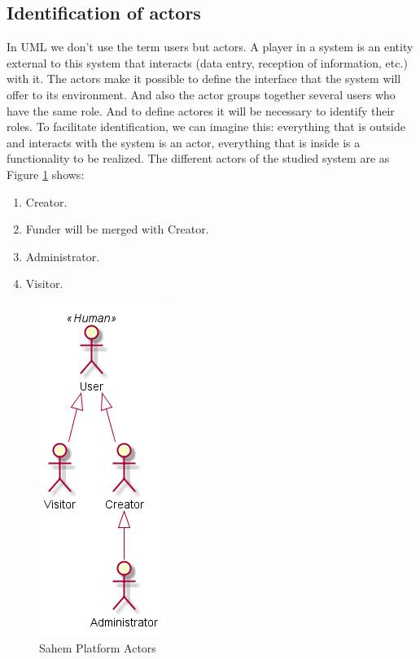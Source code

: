 \subsection{Identification of actors}
In UML we don't use the term users but actors. A player in a system is an entity external to this system that interacts (data entry, reception of information, etc.) with it. The actors make it possible to define the interface that the system will offer to its environment. And also the actor groups together several users who have the same role. And to define actores it will be necessary to identify their roles.
To facilitate identification, we can imagine this: everything that is outside and interacts with the system is an actor, everything that is inside is a functionality to be realized.
The different actors of the studied system are as Figure \ref{fig:sahemactors} shows:

\begin{enumerate}
    \item  Creator.
    \item  Funder will be merged with Creator.
    \item  Administrator.
    \item  Visitor.
\end{enumerate}

\begin{figure}[!ht]
      \centering
      \includegraphics[scale=0.60]{assets/Actors.png}
      \caption{Sahem Platform Actors}
      \label{fig:sahemactors}
\end{figure}
